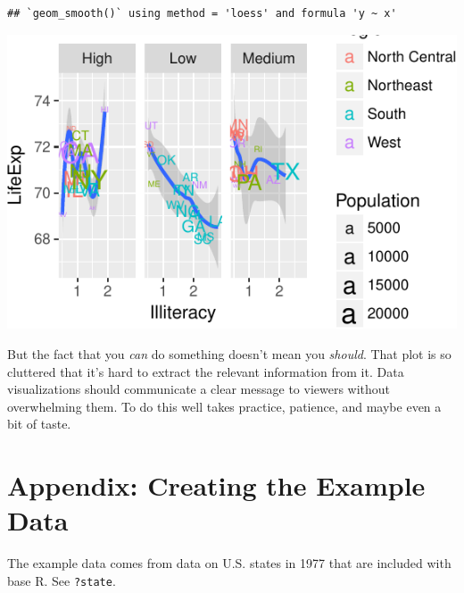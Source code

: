 \documentclass[
  12pt,
  oneside,openany]{book}
\begin{document}
\begin{verbatim}
## `geom_smooth()` using method = 'loess' and formula 'y ~ x'
\end{verbatim}

\includegraphics{pdaps_files/figure-latex/too-many-things-1.pdf}

But the fact that you \emph{can} do something doesn't mean you \emph{should}. That plot is so cluttered that it's hard to extract the relevant information from it. Data visualizations should communicate a clear message to viewers without overwhelming them. To do this well takes practice, patience, and maybe even a bit of taste.

\hypertarget{appendix-creating-the-example-data-1}{%
\section{Appendix: Creating the Example Data}\label{appendix-creating-the-example-data-1}}

The example data comes from data on U.S. states in 1977 that are included with base R. See \texttt{?state}.
\end{document}

